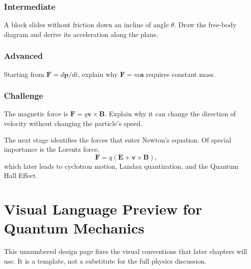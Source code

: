 \subsection*{Intermediate}
\begin{chapterexercise}
A block slides without friction down an incline of angle $\theta$.
Draw the free-body diagram and derive its acceleration along the plane.
\end{chapterexercise}

\subsection*{Advanced}
\begin{chapterexercise}
Starting from $\mathbf F=d\mathbf p/dt$, explain why
$\mathbf F=m\mathbf a$ requires constant mass.
\end{chapterexercise}

\subsection*{Challenge}
\begin{chapterexercise}
The magnetic force is $\mathbf F=q\mathbf v\times\mathbf B$.
Explain why it can change the direction of velocity without changing the
particle's speed.
\end{chapterexercise}

\chapterlookaheadheading
\begin{lookingaheadbox}
The next stage identifies the forces that enter Newton's equation. Of special
importance is the Lorentz force,
\[
\mathbf F=q(\mathbf E+\mathbf v\times\mathbf B),
\]
which later leads to cyclotron motion, Landau quantization, and the Quantum
Hall Effect.
\end{lookingaheadbox}



\clearpage
\chapter*{Visual Language Preview for Quantum Mechanics}

This unnumbered design page fixes the visual conventions that later chapters
will use. It is a template, not a substitute for the full physics discussion.
